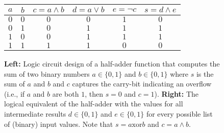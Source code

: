 \begin{figure}
\begin{minipage}[c]{.45\linewidth}
    \end{minipage} \hfill
    \begin{minipage}[c]{.5\linewidth}
        \centering
        \begin{tabular}{c|c||c|c|c|c}
            $a$ & $b$ & $c = a \land b$ & $d = a \lor b$ & $e = \neg c$ & $s = d \land e$ \\
            \hline
            $0$ & $0$ & $0$             & $0$            & $1$          & $0$             \\
            $0$ & $1$ & $0$             & $1$            & $1$          & $1$             \\
            $1$ & $0$ & $0$             & $1$            & $1$          & $1$             \\
            $1$ & $1$ & $1$             & $1$            & $0$          & $0$             \\
        \end{tabular}
    \end{minipage}
    \caption{{\bf Left:} Logic circuit design of a half-adder function that computes the sum of two binary numbers $a \in \{0,1\}$ and $b \in \{0,1\}$ where $s$ is the sum of $a$ and $b$ and $c$ captures the carry-bit indicating an overflow (i.e., if $a$ and $b$ are both $1$, then $s=0$ and $c=1$). {\bf Right:} The logical equivalent of the half-adder with the values for all intermediate results $d \in \{0,1\}$ and $e \in \{0,1\}$ for every possible list of (binary) input values. Note that $s = a \mathrm{ xor } b$ and $c = a \land b$. \label{fig:half-adder}}
\end{figure}


